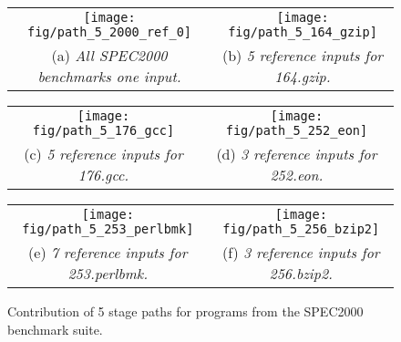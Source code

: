 \begin{figure}[h!]
    \centering
    \begin{tabular}{cc}
        \centering
        \begin{minipage}{0.5\textwidth}
        \centering
        \texttt{[image: fig/path\_5\_2000\_ref\_0]}
        \hspace{2pt}
        \end{minipage} &
        \begin{minipage}{0.5\textwidth}
        \centering
        \texttt{[image: fig/path\_5\_164\_gzip]}
        \end{minipage}
        \\  (a) \textit{All SPEC2000 benchmarks one input.} &
            (b) \textit{5 reference inputs for 164.gzip.}
    \end{tabular}
    \begin{tabular}{cc}
        \begin{minipage}{0.5\textwidth}
        \centering
        \texttt{[image: fig/path\_5\_176\_gcc]}
        \hspace{2pt}
        \end{minipage} &
        \begin{minipage}{0.5\textwidth}
        \centering
        \texttt{[image: fig/path\_5\_252\_eon]}
        \end{minipage}
        \\  (c) \textit{5 reference inputs for 176.gcc.} &
            (d) \textit{3 reference inputs for 252.eon.}
    \end{tabular}
    \begin{tabular}{cc}
        \begin{minipage}{0.5\textwidth}
        \centering
        \texttt{[image: fig/path\_5\_253\_perlbmk]}
        \hspace{2pt}
        \end{minipage} &
        \begin{minipage}{0.5\textwidth}
        \centering
        \texttt{[image: fig/path\_5\_256\_bzip2]}
        \end{minipage}
        \\  (e) \textit{7 reference inputs for 253.perlbmk.} &
            (f) \textit{3 reference inputs for 256.bzip2.}
    \end{tabular}
    \caption{Contribution of 5 stage paths for programs from the SPEC2000
benchmark suite.}
    \label{fig:path_5_contrib}
\end{figure}

